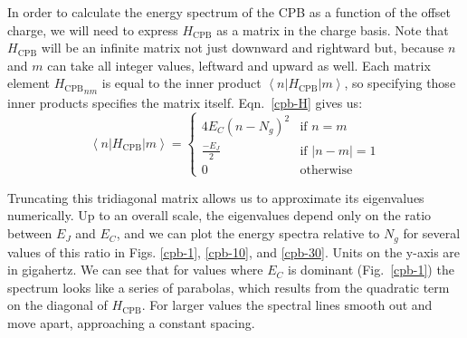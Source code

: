 \documentclass[twocolumn]{revtex4}
\newcommand{\innerp}[3]{\textstyle\left< #1 \left| #2 \right| #3 \right>}
\begin{document}
In order to calculate the energy spectrum of the CPB as a function of
the offset charge, we will need to express $H_{\text{CPB}}$ as a
matrix in the charge basis. Note that $H_{\text{CPB}}$ will be an
infinite matrix not just downward and rightward but, because $n$ and
$m$ can take all integer values, leftward and upward as well. Each
matrix element ${H_{\text{CPB}}}_{nm}$ is equal to the inner product
$\innerp{n}{H_{\text{CPB}}}{m}$, so specifying those inner products
specifies the matrix itself. Eqn.~\eqref{cpb-H} gives us:
\begin{equation}
  \innerp{n}{H_{\text{CPB}}}{m} = 
  \begin{cases}
    4E_C(n-N_g)^2 & \text{if $n=m$} \\
    \frac{-E_J}{2} & \text{if $|n-m|=1$}\\
    0 & \text{otherwise}
  \end{cases}
\end{equation}

Truncating this tridiagonal matrix allows us to approximate its
eigenvalues numerically. Up to an overall scale, the eigenvalues
depend only on the ratio between $E_J$ and $E_C$, and we can plot the
energy spectra relative to $N_g$ for several values of this ratio in
Figs. \ref{cpb-1}, \ref{cpb-10}, and \ref{cpb-30}. Units on the
y-axis are in gigahertz. We can see that for values where $E_C$ is
dominant (Fig.~\ref{cpb-1}) the spectrum looks like a series of
parabolas, which results from the quadratic term on the diagonal of
$H_{\text{CPB}}$. For larger values the spectral lines smooth out and
move apart, approaching a constant spacing.
\end{document}

